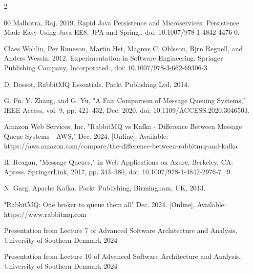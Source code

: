 \documentclass{article}
\begin{document}
\begin{multicols}{2}
\begin{thebibliography}{00}
 Malhotra, Raj. 2019. Rapid Java Persistence and Microservices: Persistence Made Easy Using Java EE8, JPA and Spring., doi: 10.1007/978-1-4842-4476-0. 

 Claes Wohlin, Per Runeson, Martin Hst, Magnus C. Ohlsson, Bjrn Regnell, and Anders Wessln. 2012. Experimentation in Software Engineering. Springer Publishing Company, Incorporated., doi: 10.1007/978-3-662-69306-3

 D. Dossot, RabbitMQ Essentials. Packt Publishing Ltd, 2014.

 G. Fu, Y. Zhang, and G. Yu, "A Fair Comparison of Message Queuing Systems," IEEE Access, vol. 9, pp. 421–432, Dec. 2020, doi: 10.1109/ACCESS.2020.3046503.

 Amazon Web Services, Inc, "RabbitMQ vs Kafka - Difference Between Message Queue Systems - AWS," Dec. 2024. [Online]. Available: https://aws.amazon.com/compare/the-difference-between-rabbitmq-and-kafka

 R. Reagan, "Message Queues," in Web Applications on Azure, Berkeley, CA: Apress, SpringerLink, 2017, pp. 343–380, doi: 10.1007/978-1-4842-2976-7\_9.

 N. Garg, Apache Kafka. Packt Publishing, Birmingham, UK, 2013.

 "RabbitMQ: One broker to queue them all" Dec. 2024. [Online]. Available: https://www.rabbitmq.com

Presentation from Lecture 7 of Advanced
Software Architecture and Analysis, University of Southern Denmark 2024

Presentation from Lecture 10 of Advanced
Software Architecture and Analysis, University of Southern Denmark 2024

\end{thebibliography}

\end{multicols}
\end{document}
